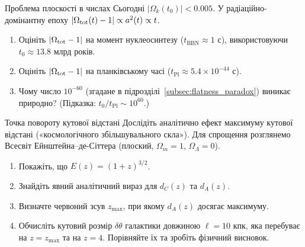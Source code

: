 \begin{problem}{Проблема плоскості в числах}
    Сьогодні $|\Omega_k(t_0)| < 0.005$.
    У радіаційно-домінантну епоху $|\Omega_{\rm tot}(t)-1| \propto a^2(t) \propto t$.
    \begin{enumerate}
        \item Оцініть $|\Omega_{\rm tot} - 1|$ на момент нуклеосинтезу
              ($t_{\text{BBN}} \approx 1$ с), використовуючи
              $t_0 \approx 13.8$ млрд років.
        \item Оцініть $|\Omega_{\rm tot} - 1|$ на планківському часі
              ($t_{\text{Pl}} \approx 5.4 \times 10^{-44}$ с).
        \item Чому число $10^{-60}$ (згадане в підрозділі~\ref{subsec:flatness_paradox})
              виникає природно? (Підказка: $t_0 / t_{\text{Pl}} \sim 10^{60}$.)
    \end{enumerate}
\end{problem}

\begin{problem}{Точка повороту кутової відстані}\label{prob:d_A_max}
    Дослідіть аналітично ефект максимуму кутової відстані
    («космологічного збільшувального скла»).
    Для спрощення розглянемо Всесвіт Ейнштейна--де-Сіттера
    (плоский, $\Omega_m = 1$, $\Omega_\Lambda = 0$).
    \begin{enumerate}
        \item Покажіть, що $E(z) = (1+z)^{3/2}$.
        \item Знайдіть явний аналітичний вираз для $d_C(z)$ та $d_A(z)$.
        \item Визначте червоний зсув $z_{\text{max}}$, при якому $d_A(z)$
              досягає максимуму.
        \item Обчисліть кутовий розмір $\delta\theta$ галактики довжиною
              $\ell = 10$ кпк, яка перебуває на $z = z_{\text{max}}$ та на $z = 4$.
              Порівняйте їх та зробіть фізичний висновок.
    \end{enumerate}
\end{problem}

